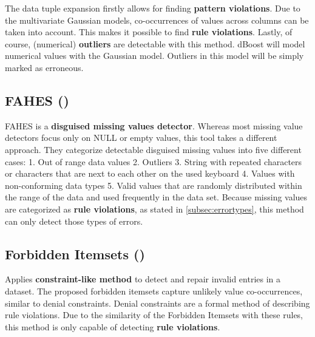 The data tuple expansion firstly allows for finding \textbf{pattern violations}. 
Due to the multivariate Gaussian models, co-occurrences of values across columns can be taken into account. This makes it possible to find \textbf{rule violations}.
Lastly, of course, (numerical) \textbf{outliers} are detectable with this method. dBoost will model numerical values with the Gaussian model. Outliers in this model will be simply marked as erroneous. 

\subsection{FAHES (\cite{Qahtan2018-te})}
FAHES is a \textbf{disguised missing values detector}. Whereas most missing value detectors focus only on NULL or empty values, this tool takes a different approach. They categorize detectable disguised missing values into five different cases: 1. Out of range data values 2. Outliers 3. String with repeated characters or characters that are next to each other on the used keyboard 4. Values with non-conforming data types 5. Valid values that are randomly distributed within the range of the data and used frequently in the data set. 
Because missing values are categorized as \textbf{rule violations}, as stated in \autoref{subsec:errortypes}, this method can only detect those types of errors. 

\subsection{Forbidden Itemsets (\cite{Rammelaere2019-ea})}
Applies \textbf{constraint-like method} to detect and repair invalid entries in a dataset. The proposed forbidden itemsets capture unlikely value co-occurrences, similar to denial constraints. Denial constraints are a formal method of describing rule violations. Due to the similarity of the Forbidden Itemsets with these rules, this
method is only capable of detecting \textbf{rule violations}.



